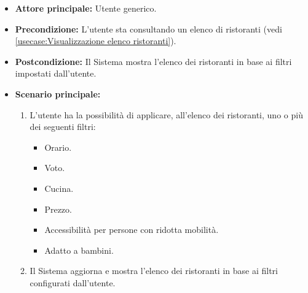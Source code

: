 \label{usecase:Filtra ristoranti}
\begin{itemize}
	\item \textbf{Attore principale:} Utente generico.
	
	\item \textbf{Precondizione:} L'utente sta consultando un elenco di ristoranti (vedi \autoref{usecase:Visualizzazione elenco ristoranti}).

	\item \textbf{Postcondizione:} Il Sistema mostra l'elenco dei ristoranti in base ai filtri impostati dall'utente.
 
	      
	\item \textbf{Scenario principale:}
	      \begin{enumerate}
		      \item L'utente ha la possibilità di applicare, all'elenco dei ristoranti, uno o più dei seguenti filtri: 
		      \begin{itemize}
                \item Orario.
                \item Voto.
                \item Cucina.
                \item Prezzo.
                \item Accessibilità per persone con ridotta mobilità.
                \item Adatto a bambini.
              \end{itemize}

		      \item Il Sistema aggiorna e mostra l'elenco dei ristoranti in base ai filtri configurati dall'utente.
	      \end{enumerate}

\end{itemize}